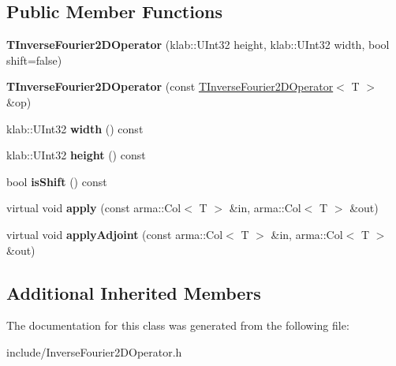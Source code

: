 \subsection*{Public Member Functions}
\begin{DoxyCompactItemize}
\item 
{\bfseries T\+Inverse\+Fourier2\+D\+Operator} (klab\+::\+U\+Int32 height, klab\+::\+U\+Int32 width, bool shift=false)\hypertarget{classkl1p_1_1TInverseFourier2DOperator_a82eb1802681b2e93d7ff9f770087a6b1}{}\label{classkl1p_1_1TInverseFourier2DOperator_a82eb1802681b2e93d7ff9f770087a6b1}

\item 
{\bfseries T\+Inverse\+Fourier2\+D\+Operator} (const \hyperlink{classkl1p_1_1TInverseFourier2DOperator}{T\+Inverse\+Fourier2\+D\+Operator}$<$ T $>$ \&op)\hypertarget{classkl1p_1_1TInverseFourier2DOperator_a62049a21074fe238e4a568de03537ee2}{}\label{classkl1p_1_1TInverseFourier2DOperator_a62049a21074fe238e4a568de03537ee2}

\item 
klab\+::\+U\+Int32 {\bfseries width} () const \hypertarget{classkl1p_1_1TInverseFourier2DOperator_aebf7160bfe28b5f366a3694ad6981df9}{}\label{classkl1p_1_1TInverseFourier2DOperator_aebf7160bfe28b5f366a3694ad6981df9}

\item 
klab\+::\+U\+Int32 {\bfseries height} () const \hypertarget{classkl1p_1_1TInverseFourier2DOperator_a3e73c70b4d9aa0b6332d13dc6106145f}{}\label{classkl1p_1_1TInverseFourier2DOperator_a3e73c70b4d9aa0b6332d13dc6106145f}

\item 
bool {\bfseries is\+Shift} () const \hypertarget{classkl1p_1_1TInverseFourier2DOperator_afaaf34a0c7a461571902b793465526af}{}\label{classkl1p_1_1TInverseFourier2DOperator_afaaf34a0c7a461571902b793465526af}

\item 
virtual void {\bfseries apply} (const arma\+::\+Col$<$ T $>$ \&in, arma\+::\+Col$<$ T $>$ \&out)\hypertarget{classkl1p_1_1TInverseFourier2DOperator_a85597bcec3dfb26961d8440a0474c6e8}{}\label{classkl1p_1_1TInverseFourier2DOperator_a85597bcec3dfb26961d8440a0474c6e8}

\item 
virtual void {\bfseries apply\+Adjoint} (const arma\+::\+Col$<$ T $>$ \&in, arma\+::\+Col$<$ T $>$ \&out)\hypertarget{classkl1p_1_1TInverseFourier2DOperator_ac0647122ff006e614302eee9096e3704}{}\label{classkl1p_1_1TInverseFourier2DOperator_ac0647122ff006e614302eee9096e3704}

\end{DoxyCompactItemize}
\subsection*{Additional Inherited Members}


The documentation for this class was generated from the following file\+:\begin{DoxyCompactItemize}
\item 
include/Inverse\+Fourier2\+D\+Operator.\+h\end{DoxyCompactItemize}
